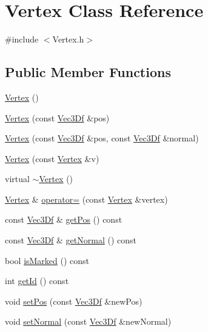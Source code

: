 \hypertarget{class_vertex}{
\section{Vertex Class Reference}
\label{class_vertex}
}


{\ttfamily \#include $<$Vertex.h$>$}

\subsection*{Public Member Functions}
\begin{DoxyCompactItemize}
\item 
\hyperlink{class_vertex_a97488994a2482d70da74e1b91d40e169}{Vertex} ()
\item 
\hyperlink{class_vertex_af7a13faf027010bf791afeab4b7e5334}{Vertex} (const \hyperlink{class_vec3_d}{Vec3Df} \&pos)
\item 
\hyperlink{class_vertex_a27a83fd914a9c3356e1a91175af9dcb2}{Vertex} (const \hyperlink{class_vec3_d}{Vec3Df} \&pos, const \hyperlink{class_vec3_d}{Vec3Df} \&normal)
\item 
\hyperlink{class_vertex_a2cd575cac73be8dba0f87dfc38fe20e7}{Vertex} (const \hyperlink{class_vertex}{Vertex} \&v)
\item 
virtual \hyperlink{class_vertex_abc07e7e9ea84be7a07dd1b0e70de579e}{$\sim$Vertex} ()
\item 
\hyperlink{class_vertex}{Vertex} \& \hyperlink{class_vertex_a0a25587d8b6e15e799bd4384a9f443cf}{operator=} (const \hyperlink{class_vertex}{Vertex} \&vertex)
\item 
const \hyperlink{class_vec3_d}{Vec3Df} \& \hyperlink{class_vertex_abc85a4fa1297c23dbb5bd99c3b410943}{getPos} () const 
\item 
const \hyperlink{class_vec3_d}{Vec3Df} \& \hyperlink{class_vertex_ad35a48e6284848d838dc57fe8876beea}{getNormal} () const 
\item 
bool \hyperlink{class_vertex_afa6b3258a4e1702a9335c1bd65dc1f39}{isMarked} () const 
\item 
int \hyperlink{class_vertex_aa61ee83bfe1b0c80f0b554663bdbd2da}{getId} () const 
\item 
void \hyperlink{class_vertex_a2e70cf74099095e6dcbf1cb0b6c36a60}{setPos} (const \hyperlink{class_vec3_d}{Vec3Df} \&newPos)
\item 
void \hyperlink{class_vertex_a8a7525b1dbd634e704d298cb4b49a6e8}{setNormal} (const \hyperlink{class_vec3_d}{Vec3Df} \&newNormal)
\item 

\end{DoxyCompactItemize}
